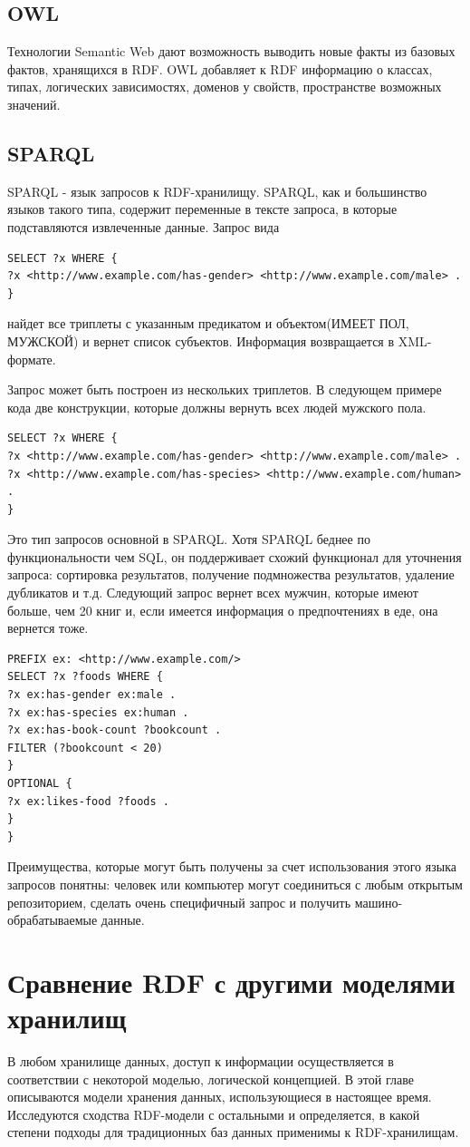 \documentclass[specialist,subf,href,colorlinks=true
]{disser}
\begin{document}
\section{OWL}
Технологии Semantic Web дают возможность выводить новые факты из базовых фактов, хранящихся в RDF. OWL добавляет к RDF информацию о классах, типах, логических зависимостях, доменов у свойств, пространстве возможных значений. 
\section{SPARQL}
SPARQL - язык запросов к RDF-хранилищу. SPARQL, как и большинство языков такого типа, содержит переменные в тексте запроса, в которые подставляются извлеченные данные.
Запрос вида
\begin{lstlisting}
SELECT ?x WHERE {
?x <http://www.example.com/has-gender> <http://www.example.com/male> . 
}
\end{lstlisting}
найдет все триплеты с указанным предикатом и объектом(ИМЕЕТ ПОЛ, МУЖСКОЙ) и вернет список субъектов. Информация возвращается в XML-формате.

Запрос может быть построен из нескольких триплетов. В следующем примере кода две конструкции, которые должны вернуть всех людей мужского пола.
\begin{lstlisting}
SELECT ?x WHERE {
?x <http://www.example.com/has-gender> <http://www.example.com/male> .
?x <http://www.example.com/has-species> <http://www.example.com/human> .
}
\end{lstlisting}
Это тип запросов основной в SPARQL. Хотя SPARQL беднее по функциональности чем SQL, он поддерживает схожий функционал для уточнения запроса: сортировка результатов, получение подмножества результатов, удаление дубликатов и т.д.
Следующий запрос вернет всех мужчин, которые имеют больше, чем 20 книг и, если имеется информация о предпочтениях в еде, она вернется тоже.
\begin{lstlisting}
PREFIX ex: <http://www.example.com/>
SELECT ?x ?foods WHERE {
?x ex:has-gender ex:male .
?x ex:has-species ex:human .
?x ex:has-book-count ?bookcount .
FILTER (?bookcount < 20)
}
OPTIONAL {
?x ex:likes-food ?foods .
}
}
\end{lstlisting}
Преимущества, которые могут быть получены за счет использования этого языка запросов понятны: человек или компьютер могут соединиться с любым открытым репозиторием, сделать очень специфичный запрос и получить машино-обрабатываемые данные.
\chapter{Сравнение RDF с другими моделями хранилищ}
В любом хранилище данных, доступ к информации осуществляется в соответствии с некоторой моделью, логической концепцией. В этой главе описываются модели хранения данных, использующиеся в настоящее время. Исследуются сходства RDF-модели с остальными и определяется, в какой степени подходы для традиционных баз данных применимы к RDF-хранилищам.
\end{document}
